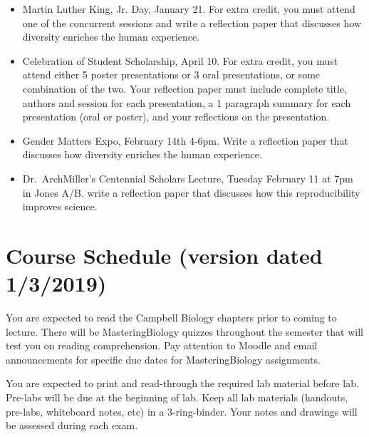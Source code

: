 \documentclass{tufte-handout}
\begin{document}
\begin{fullwidth}
\begin{itemize}
\item Martin Luther King, Jr. Day, January 21. For extra credit, you must attend one of the concurrent sessions and write a reflection paper that discusses how diversity enriches the human experience. 
\item Celebration of Student Scholarship, April 10.  For extra credit, you must attend either 5 poster presentations or 3 oral presentations, or some combination of the two.  Your reflection paper must include complete title, authors and session for each presentation, a 1 paragraph summary for each presentation (oral or poster), and your reflections on the presentation.  	
\item Gender Matters Expo, February 14th 4-6pm. Write a reflection paper that discusses how diversity enriches the human experience.
\item Dr.\ ArchMiller's Centennial Scholars Lecture, Tuesday February 11 at 7pm in Jones A/B. write a reflection paper that discusses how this reproducibility improves science.
\end{itemize}









\newpage
\section{Course Schedule (version dated 1/3/2019)}
%

 You are expected to read the Campbell Biology chapters prior to coming to lecture.  There will be MasteringBiology quizzes throughout the semester that will test you on reading comprehension. Pay attention to Moodle and email announcements for specific due dates for MasteringBiology assignments.

 You are expected to print and read-through the required lab material before lab. Pre-labs will be due at the beginning of lab. Keep all lab materials (handouts, pre-labs, whiteboard notes, etc) in a 3-ring-binder. Your notes and drawings will be assessed during each exam.


\end{fullwidth}
\end{document}
